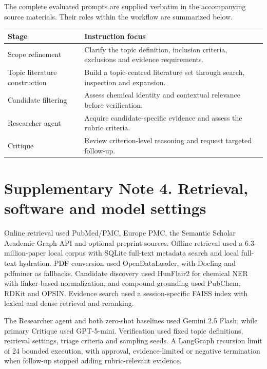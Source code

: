 \documentclass[10pt]{article}
\begin{document}
The complete evaluated prompts are supplied verbatim in the accompanying source materials. Their roles within the workflow are summarized below.

\begin{center}\small
\begin{tabular}{p{.28\linewidth}p{.65\linewidth}}\toprule
Stage & Instruction focus\\\midrule
Scope refinement & Clarify the topic definition, inclusion criteria, exclusions and evidence requirements.\\
Topic literature construction & Build a topic-centred literature set through search, inspection and expansion.\\
Candidate filtering & Assess chemical identity and contextual relevance before verification.\\
Researcher agent & Acquire candidate-specific evidence and assess the rubric criteria.\\
Critique & Review criterion-level reasoning and request targeted follow-up.\\\bottomrule
\end{tabular}\end{center}

\section*{Supplementary Note 4. Retrieval, software and model settings}

Online retrieval used PubMed/PMC, Europe PMC, the Semantic Scholar Academic Graph API and optional preprint sources. Offline retrieval used a 6.3-million-paper local corpus with SQLite full-text metadata search and local full-text hydration. PDF conversion used OpenDataLoader, with Docling and pdfminer as fallbacks. Candidate discovery used HunFlair2 for chemical NER with linker-based normalization, and compound grounding used PubChem, RDKit and OPSIN. Evidence search used a session-specific FAISS index with lexical and dense retrieval and reranking.

The Researcher agent and both zero-shot baselines used Gemini 2.5 Flash, while primary Critique used GPT-5-mini. Verification used fixed topic definitions, retrieval settings, triage criteria and sampling seeds. A LangGraph recursion limit of 24 bounded execution, with approval, evidence-limited or negative termination when follow-up stopped adding rubric-relevant evidence.

\end{document}
